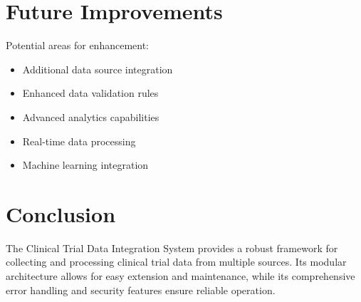 \documentclass[12pt]{article}
\begin{document}
\section{Future Improvements}
Potential areas for enhancement:
\begin{itemize}
    \item Additional data source integration
    \item Enhanced data validation rules
    \item Advanced analytics capabilities
    \item Real-time data processing
    \item Machine learning integration
\end{itemize}

\section{Conclusion}
The Clinical Trial Data Integration System provides a robust framework for collecting and processing clinical trial data from multiple sources. Its modular architecture allows for easy extension and maintenance, while its comprehensive error handling and security features ensure reliable operation.
\end{document}
